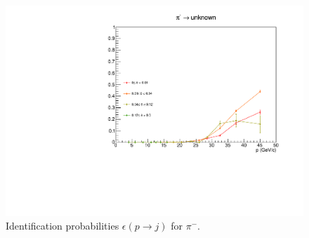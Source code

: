 \begin{figure}[!p]
  \includegraphics[scale=0.38]{./gfx/pim_u.pdf}
	\caption{Identification probabilities $\epsilon(p \rightarrow j)$ for $\pi^-$.}
	\label{pic:Effpim}
\end{figure}

